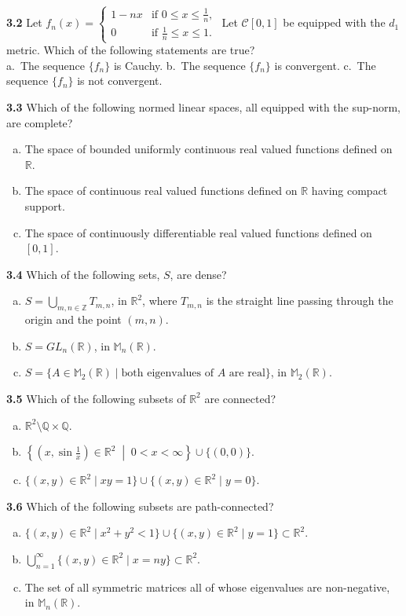 \documentclass[11pt,a4paper]{article}
\newcommand{\Z}{\mathbb{Z}}
\newcommand{\Q}{\mathbb{Q}}
\newcommand{\R}{\mathbb{R}}
\newcommand{\M}{\mathbb{M}}
\newcommand{\qitem}[1]{\par\medskip\noindent\textbf{#1}\hspace{0.5em}}
\begin{document}
\qitem{3.2} Let $f_n(x) = \begin{cases} 1 - nx & \text{if } 0 \le x \le \frac{1}{n}, \\ 0 & \text{if } \frac{1}{n} \le x \le 1. \end{cases}$ Let $\mathcal{C}[0, 1]$ be equipped with the $d_1$ metric. Which of the following statements are true?\\
a.\ The sequence $\{f_n\}$ is Cauchy. \qquad b.\ The sequence $\{f_n\}$ is convergent. \qquad c.\ The sequence $\{f_n\}$ is not convergent.

\qitem{3.3} Which of the following normed linear spaces, all equipped with the sup-norm, are complete?
\begin{enumerate}[a.]
  \item The space of bounded uniformly continuous real valued functions defined on $\R$.
  \item The space of continuous real valued functions defined on $\R$ having compact support.
  \item The space of continuously differentiable real valued functions defined on $[0, 1]$.
\end{enumerate}

\qitem{3.4} Which of the following sets, $S$, are dense?
\begin{enumerate}[a.]
  \item $S = \bigcup_{m,n \in \Z} T_{m,n}$, in $\R^2$, where $T_{m,n}$ is the straight line passing through the origin and the point $(m, n)$.
  \item $S = GL_n(\R)$, in $\M_n(\R)$.
  \item $S = \{A \in \M_2(\R) \mid \text{both eigenvalues of } A \text{ are real}\}$, in $\M_2(\R)$.
\end{enumerate}

\qitem{3.5} Which of the following subsets of $\R^2$ are connected?
\begin{enumerate}[a.]
  \item $\R^2 \setminus \Q \times \Q$.
  \item $\left\{\left(x, \sin\frac{1}{x}\right) \in \R^2 \;\middle|\; 0 < x < \infty\right\} \cup \{(0, 0)\}$.
  \item $\{(x, y) \in \R^2 \mid xy = 1\} \cup \{(x, y) \in \R^2 \mid y = 0\}$.
\end{enumerate}

\qitem{3.6} Which of the following subsets are path-connected?
\begin{enumerate}[a.]
  \item $\{(x, y) \in \R^2 \mid x^2 + y^2 < 1\} \cup \{(x, y) \in \R^2 \mid y = 1\} \subset \R^2$.
  \item $\bigcup_{n=1}^{\infty} \{(x, y) \in \R^2 \mid x = ny\} \subset \R^2$.
  \item The set of all symmetric matrices all of whose eigenvalues are non-negative, in $\M_n(\R)$.
\end{enumerate}
\end{document}
